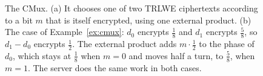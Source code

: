 \begin{figure}[!htb]
\centering

\caption{The CMux. (a) It chooses one of two TRLWE ciphertexts according to
a bit $m$ that is itself encrypted, using one external product. (b) The case of
Example~\ref{ex:cmux}: $d_0$ encrypts $\frac18$ and $d_1$ encrypts $\frac58$,
so $d_1-d_0$ encrypts $\frac12$. The external product adds $m\cdot\frac12$ to the
phase of $d_0$, which stays at $\frac18$ when $m=0$ and moves half a turn, to
$\frac58$, when $m=1$. The server does the same work in both cases.}
\label{fig:cmux}
\end{figure}

